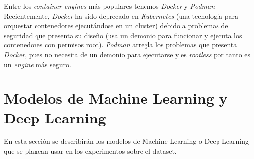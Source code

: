Entre los \textit{container engines} más populares tenemos \textit{Docker} \cite{docker} y \textit{Podman} \cite{podman}. Recientemente, \textit{Docker} ha sido deprecado en \textit{Kubernetes} (una tecnología para orquestar contenedores ejecutándose en un cluster) debido a problemas de seguridad que presenta su diseño (usa un demonio para funcionar y ejecuta los contenedores con permisos root). \textit{Podman} arregla los problemas que presenta \textit{Docker}, pues no necesita de un demonio para ejecutarse y es \textit{rootless} por tanto es un \textit{engine} más seguro.

\section{Modelos de Machine Learning y Deep Learning}

En esta sección se describirán los modelos de Machine Learning o Deep Learning que se planean usar en los experimentos sobre el dataset.
